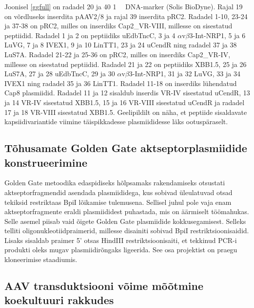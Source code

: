\documentclass{trkut}%
\begin{document}
Joonisel \ref{ggfull} on radadel 20 ja 40 \SI{1}{\kilo\base} DNA-marker (Solis BioDyne). Rajal 19 on võrdluseks inserdita pAAV2/8 ja rajal 39 inserdita pRC2. Radadel 1-10, 23-24 ja 37-38 on pRC2, milles on inserdiks Cap2\_VR-VIII, millesse on sisestatud peptiidid. Radadel 1 ja 2 on peptiidiks uEdbTncC, 3 ja 4 $\alpha$v$\beta$3-Int-NRP1, 5 ja 6 LuVG, 7 ja 8 IVEX1, 9 ja 10 LinTT1, 23 ja 24 uCendR ning radadel 37 ja 38 LuS7A. Radadel 21-22 ja 25-36 on pRC2, milles on inserdiks Cap2\_VR-IV, millesse on sisestatud peptiidid. Radadel 21 ja 22 on peptiidiks XBB1.5, 25 ja 26 LuS7A, 27 ja 28 uEdbTncC, 29 ja 30 $\alpha$v$\beta$3-Int-NRP1, 31 ja 32 LuVG, 33 ja 34 IVEX1 ning radadel 35 ja 36 LinTT1. Radadel 11-18 on inserdiks lühendatud Cap8 plasmiidid. Radadel 11 ja 12 sisaldub inserdis VR-IV sisestatud uCendR, 13 ja 14 VR-IV sisestatud XBB1.5, 15 ja 16 VR-VIII sisestatud uCendR ja radadel 17 ja 18 VR-VIII sisestatud XBB1.5. Geelipildilt on näha, et peptiide sisaldavate kapsiidivariantide viimine täispikkadesse plasmiididesse läks ootuspäraselt.

\subsection{Tõhusamate Golden Gate aktseptorplasmiidide konstrueerimine}

Golden Gate metoodika edaspidiseks hõlpsamaks rakendamiseks otsustati
aktseptorfragmendid asendada plasmiididega, kus sobivad üleulatuvad otsad tekiksid restriktaas BpiI lõikamise tulemusena. Sellisel juhul pole vaja enam aktseptorfragmente eraldi plasmiididest puhastada, mis on äärmiselt töömahukas. Selle asemel piisab vaid õigete Golden Gate
plasmiidide kokkusegamisest. Selleks telliti oligonukleotiidpraimerid, millesse disainiti sobivad BpiI restriktsioonisaidid. Lisaks sisaldab praimer 5’ otsas HindIII restriktsioonisaiti, et tekkinud PCR-i produkti oleks mugav plasmiidirõngaks ligeerida. See osa projektist on praegu kloneerimise staadiumis.


\subsection{AAV transduktsiooni võime mõõtmine koekultuuri rakkudes}
\end{document}
